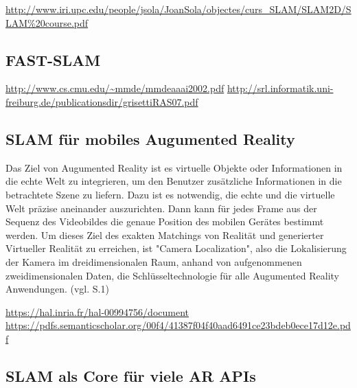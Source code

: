 \url{http://www.iri.upc.edu/people/jsola/JoanSola/objectes/curs_SLAM/SLAM2D/SLAM%20course.pdf}

\subsection{FAST-SLAM}

\url{http://www.cs.cmu.edu/~mmde/mmdeaaai2002.pdf}
\url{http://srl.informatik.uni-freiburg.de/publicationsdir/grisettiRAS07.pdf}


\subsection{SLAM für mobiles Augumented Reality}

Das Ziel von Augumented Reality ist es virtuelle Objekte oder Informationen in die echte Welt zu integrieren, um den Benutzer zusätzliche Informationen in die betrachtete Szene zu liefern. Dazu ist es notwendig, die echte und die virtuelle Welt präzise aneinander auszurichten. Dann kann für jedes Frame aus der Sequenz des Videobildes die genaue Position des mobilen Gerätes bestimmt werden. Um dieses Ziel des exakten Matchings von Realität und generierter Virtueller Realität zu erreichen, ist "Camera Localization", also die Lokalisierung der Kamera im dreidimensionalen Raum, anhand von aufgenommenen zweidimensionalen Daten, die Schlüsseltechnologie für alle Augumented Reality Anwendungen. (vgl. \cite{slam_mobile} S.1)

\url{https://hal.inria.fr/hal-00994756/document}
\url{https://pdfs.semanticscholar.org/00f4/41387f04f40aad6491ce23bdeb0ece17d12e.pdf}



\subsection{SLAM als Core für viele AR APIs}